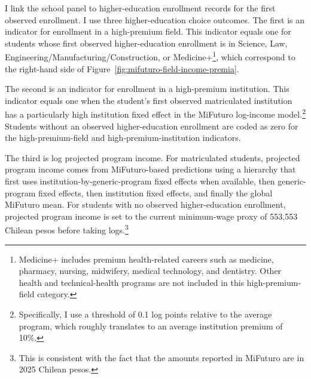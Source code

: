 \documentclass[a4paper, article, english, oneside, unknownkeysallowed, 12pt]{memoir}
\begin{document}
I link the school panel to higher-education enrollment records for the first observed enrollment.
I use three higher-education choice outcomes.
The first is an indicator for enrollment in a high-premium field.
This indicator equals one for students whose first observed higher-education enrollment is in Science, Law, Engineering/Manufacturing/Construction, or Medicine+\footnote{Medicine+ includes premium health-related careers such as medicine, pharmacy, nursing, midwifery, medical technology, and dentistry.
Other health and technical-health programs are not included in this high-premium-field category.}, which correspond to the right-hand side of Figure~\ref{fig:mifuturo-field-income-premia}.


The second is an indicator for enrollment in a high-premium institution.
This indicator equals one when the student's first observed matriculated institution has a particularly high institution fixed effect in the MiFuturo log-income model.\footnote{Specifically, I use a threshold of 0.1 log points relative to the average program, which roughly translates to an average institution premium of 10\%.}
Students without an observed higher-education enrollment are coded as zero for the high-premium-field and high-premium-institution indicators.

The third is log projected program income.
For matriculated students, projected program income comes from MiFuturo-based predictions using a hierarchy that first uses institution-by-generic-program fixed effects when available, then generic-program fixed effects, then institution fixed effects, and finally the global MiFuturo mean.
For students with no observed higher-education enrollment, projected program income is set to the current minimum-wage proxy of 553,553 Chilean pesos before taking logs.\footnote{This is consistent with the fact that the amounts reported in MiFuturo are in 2025 Chilean pesos.}


\end{document}
